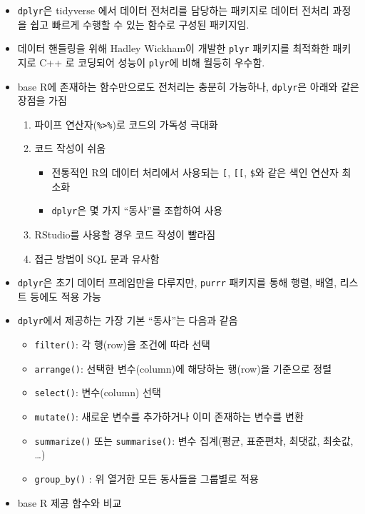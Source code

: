 \documentclass[
  11pt,
]{krantz}
\providecommand{\tightlist}{%
  \setlength{\itemsep}{0pt}\setlength{\parskip}{0pt}}
\begin{document}
\begin{itemize}
\item
  \texttt{dplyr}은 tidyverse 에서 데이터 전처리를 담당하는 패키지로 데이터 전처리 과정을 쉽고 빠르게 수행할 수 있는 함수로 구성된 패키지임.
\item
  데이터 핸들링을 위해 Hadley Wickham이 개발한 \texttt{plyr} 패키지를 최적화한 패키지로 C++ 로 코딩되어 성능이 \texttt{plyr}에 비해 월등히 우수함.
\item
  base R에 존재하는 함수만으로도 전처리는 충분히 가능하나, \texttt{dplyr}은 아래와 같은 장점을 가짐

  \begin{enumerate}
  \def\labelenumi{\alph{enumi}.}
  \item
    파이프 연산자(\texttt{\%\textgreater{}\%})로 코드의 가독성 극대화
  \item
    코드 작성이 쉬움

    \begin{itemize}
    \tightlist
    \item
      전통적인 R의 데이터 처리에서 사용되는 \texttt{{[}}, \texttt{{[}{[}}, \texttt{\$}와 같은 색인 연산자 최소화
    \item
      \texttt{dplyr}은 몇 가지 ``동사''를 조합하여 사용
    \end{itemize}
  \item
    RStudio를 사용할 경우 코드 작성이 빨라짐
  \item
    접근 방법이 SQL 문과 유사함
  \end{enumerate}
\item
  \texttt{dplyr}은 초기 데이터 프레임만을 다루지만, \texttt{purrr} 패키지를 통해 행렬, 배열, 리스트 등에도 적용 가능
\item
  \texttt{dplyr}에서 제공하는 가장 기본 ``동사''는 다음과 같음

  \begin{itemize}
  \item
    \texttt{filter()}: 각 행(row)을 조건에 따라 선택
  \item
    \texttt{arrange()}: 선택한 변수(column)에 해당하는 행(row)을 기준으로 정렬
  \item
    \texttt{select()}: 변수(column) 선택
  \item
    \texttt{mutate()}: 새로운 변수를 추가하거나 이미 존재하는 변수를 변환
  \item
    \texttt{summarize()} 또는 \texttt{summarise()}: 변수 집계(평균, 표준편차, 최댓값, 최솟값, \ldots)
  \item
    \texttt{group\_by()} : 위 열거한 모든 동사들을 그룹별로 적용
  \end{itemize}
\item
  base R 제공 함수와 비교
\end{itemize}
\end{document}
